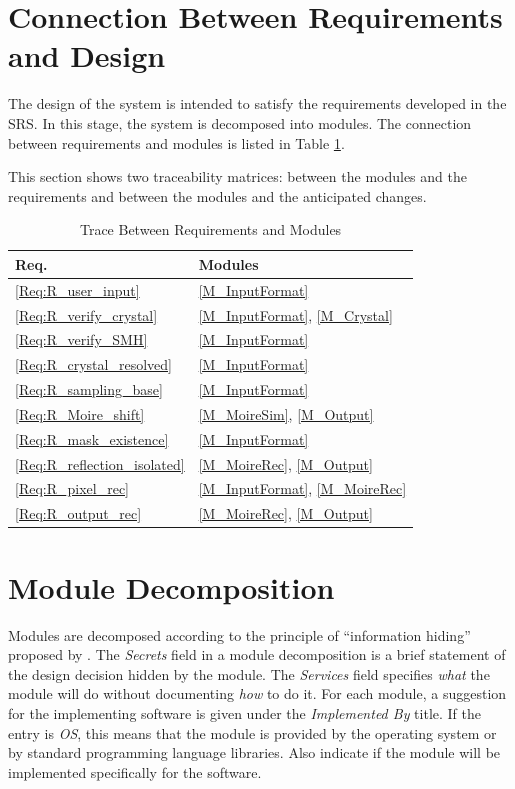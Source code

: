 \documentclass[12pt, titlepage]{article}
\begin{document}
\section{Connection Between Requirements and Design} \label{SecConnection}

The design of the system is intended to satisfy the requirements developed in
the SRS. In this stage, the system is decomposed into modules. The connection
between requirements and modules is listed in Table \ref{TblRT}.

This section shows two traceability matrices: between the modules and the
requirements and between the modules and the anticipated changes.

\begin{table}[H]
\centering
\begin{tabular}{p{} p{}}
\toprule
\textbf{Req.} & \textbf{Modules}\\
\midrule
\cref{Req:R_user_input} & \cref{M_InputFormat} \\
\cref{Req:R_verify_crystal} & \cref{M_InputFormat}, \cref{M_Crystal} \\
\cref{Req:R_verify_SMH} & \cref{M_InputFormat}  \\
\cref{Req:R_crystal_resolved} & \cref{M_InputFormat} \\
\cref{Req:R_sampling_base} & \cref{M_InputFormat} \\
\cref{Req:R_Moire_shift} & \cref{M_MoireSim}, \cref{M_Output} \\
\cref{Req:R_mask_existence} & \cref{M_InputFormat} \\
\cref{Req:R_reflection_isolated} & \cref{M_MoireRec}, \cref{M_Output} \\
\cref{Req:R_pixel_rec} & \cref{M_InputFormat}, \cref{M_MoireRec}\\
\cref{Req:R_output_rec} & \cref{M_MoireRec}, \cref{M_Output}\\
\bottomrule
\end{tabular}
\caption{Trace Between Requirements and Modules}
\label{TblRT}
\end{table}

\section{Module Decomposition} \label{SecMD}

Modules are decomposed according to the principle of ``information hiding''
proposed by \cite{ParnasEtAl1984}. The \emph{Secrets} field in a module
decomposition is a brief statement of the design decision hidden by the
module. The \emph{Services} field specifies \emph{what} the module will do
without documenting \emph{how} to do it. For each module, a suggestion for the
implementing software is given under the \emph{Implemented By} title. If the
entry is \emph{OS}, this means that the module is provided by the operating
system or by standard programming language libraries.  Also indicate if the
module will be implemented specifically for the software.
\end{document}
